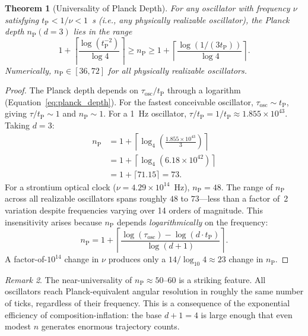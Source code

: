 \documentclass[twocolumn,10pt,a4paper]{article}
\newtheorem{theorem}{Theorem}[section]
\theoremstyle{definition}
\theoremstyle{remark}
\newtheorem{remark}[theorem]{Remark}
\newcommand{\tP}{t_{\mathrm{P}}}
\newcommand{\nP}{n_{\mathrm{P}}}
\begin{document}
\begin{theorem}[Universality of Planck Depth]
\label{thm:universality}
For any oscillator with frequency $\nu$ satisfying $\tP < 1/\nu < 1$~s (i.e., any physically realizable oscillator), the Planck depth $\nP(d=3)$ lies in the range
\begin{equation}
1 + \left\lceil \frac{\log(\tP^{-2})}{\log 4} \right\rceil \geq \nP \geq 1 + \left\lceil \frac{\log(1/(3\tP))}{\log 4} \right\rceil.
\end{equation}
Numerically, $\nP \in [36, 72]$ for all physically realizable oscillators.
\end{theorem}

\begin{proof}
The Planck depth depends on $\tau_{\mathrm{osc}}/\tP$ through a logarithm (Equation~\ref{eq:planck_depth}). For the fastest conceivable oscillator, $\tau_{\mathrm{osc}} \sim \tP$, giving $\tau/\tP \sim 1$ and $\nP \sim 1$. For a 1~Hz oscillator, $\tau/\tP = 1/\tP \approx 1.855 \times 10^{43}$. Taking $d = 3$:
\begin{align}
\nP &= 1 + \left\lceil \log_4\!\left(\frac{1.855 \times 10^{43}}{3}\right) \right\rceil \nonumber \\
    &= 1 + \left\lceil \log_4(6.18 \times 10^{42}) \right\rceil \nonumber \\
    &= 1 + \lceil 71.15 \rceil = 73.
\end{align}
For a strontium optical clock ($\nu = 4.29 \times 10^{14}$~Hz), $\nP = 48$. The range of $\nP$ across all realizable oscillators spans roughly $48$ to $73$---less than a factor of~2 variation despite frequencies varying over 14 orders of magnitude. This insensitivity arises because $\nP$ depends \emph{logarithmically} on the frequency:
\begin{equation}
\nP = 1 + \left\lceil \frac{\log(\tau_{\mathrm{osc}}) - \log(d \cdot \tP)}{\log(d+1)} \right\rceil.
\end{equation}
A factor-of-$10^{14}$ change in $\nu$ produces only a $14 / \log_{10} 4 \approx 23$ change in $\nP$.
\end{proof}

\begin{remark}
The near-universality of $\nP \approx 50$--$60$ is a striking feature. All oscillators reach Planck-equivalent angular resolution in roughly the same number of ticks, regardless of their frequency. This is a consequence of the exponential efficiency of composition-inflation: the base $d+1 = 4$ is large enough that even modest $n$ generates enormous trajectory counts.
\end{remark}
\end{document}
